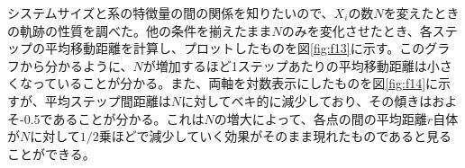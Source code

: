 システムサイズと系の特徴量の間の関係を知りたいので、$X_{i}$の数$N$を変えたときの軌跡の性質を調べた。他の条件を揃えたまま$N$のみを変化させたとき、各ステップの平均移動距離を計算し、プロットしたものを図\ref{fig:f13}に示す。このグラフから分かるように、$N$が増加するほど1ステップあたりの平均移動距離は小さくなっていることが分かる。また、両軸を対数表示にしたものを図\ref{fig:f14}に示すが、平均ステップ間距離は$N$に対してベキ的に減少しており、その傾きはおよそ-0.5であることが分かる。これは$N$の増大によって、各点の間の平均距離$r$自体が$N$に対して$1/2$乗ほどで減少していく効果がそのまま現れたものであると見ることができる。




